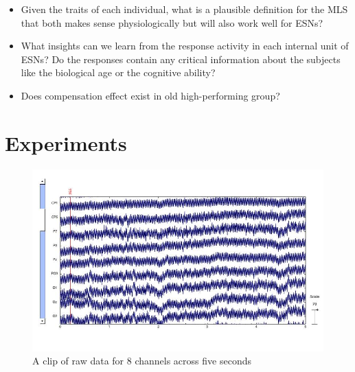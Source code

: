 \documentclass[a4paper,11pt,oneside]{article}
\begin{document}
\begin{itemize}
	\item Given the traits of each individual, what is a plausible definition for the MLS that both makes sense physiologically but will also work well for ESNs?
	\item What insights can we learn from the response activity in each internal unit of ESNs? Do the responses contain any critical information about the subjects like the biological age or the cognitive ability?
	\item Does compensation effect exist in old high-performing group?
\end{itemize}

\section{Experiments}
\begin{figure}[h]
	\centering
	\includegraphics[width=1.0\textwidth]{img/visu}
	\caption{A clip of raw data for 8 channels across five seconds}
\end{figure}
\end{document}
